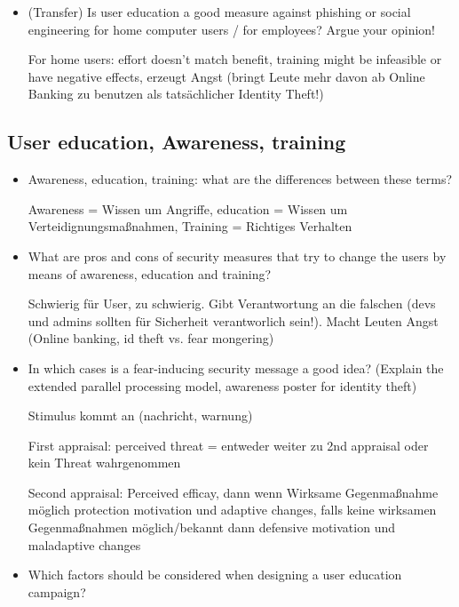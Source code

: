 \begin{itemize}
\begin{itemize}
		\end{itemize}

	\item
		(Transfer) Is user education a good measure against phishing or social engineering for home computer users / for employees? Argue your opinion!

		For home users: effort doesn't match benefit, training might be infeasible or have negative effects, erzeugt Angst (bringt Leute mehr davon ab Online Banking zu benutzen als tatsächlicher Identity Theft!)
\end{itemize}

\subsection{User education, Awareness, training}
\begin{itemize}
	\item
		Awareness, education, training: what are the differences between these terms?

		Awareness = Wissen um Angriffe, education = Wissen um Verteidignungsmaßnahmen, Training = Richtiges Verhalten
	\item
		What are pros and cons of security measures that try to change the users by means of awareness, education and training?

		Schwierig für User, zu schwierig. Gibt Verantwortung an die falschen (devs und admins sollten für Sicherheit verantworlich sein!). Macht Leuten Angst (Online banking, id theft vs. fear mongering)
	\item
		In which cases is a fear-inducing security message a good idea? (Explain the extended parallel processing model, awareness poster for identity theft)

		Stimulus kommt an (nachricht, warnung)

		First appraisal: perceived threat = entweder weiter zu 2nd appraisal oder kein Threat wahrgenommen

		Second appraisal: Perceived efficay, dann wenn Wirksame Gegenmaßnahme möglich protection motivation und adaptive changes, falls keine wirksamen Gegenmaßnahmen möglich/bekannt dann defensive motivation und maladaptive changes
	\item
		Which factors should be considered when designing a user education campaign?
\end{itemize}

